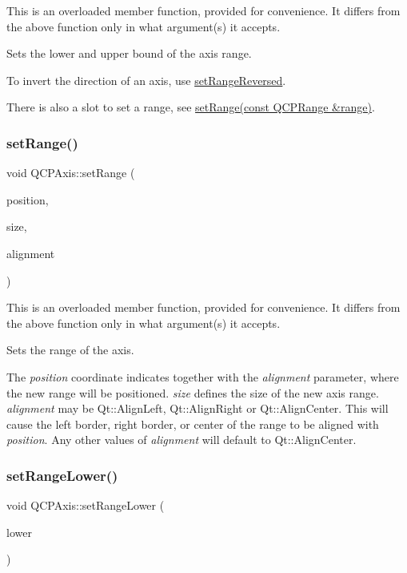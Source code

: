 This is an overloaded member function, provided for convenience. It differs from the above function only in what argument(s) it accepts.

Sets the lower and upper bound of the axis range.

To invert the direction of an axis, use \hyperlink{classQCPAxis_a2172fdb196b1a0dc3f40992fcad8e9e1}{set\+Range\+Reversed}.

There is also a slot to set a range, see \hyperlink{classQCPAxis_aebdfea5d44c3a0ad2b4700cd4d25b641}{set\+Range(const Q\+C\+P\+Range \&range)}. \mbox{\label{classQCPAxis_acf60e5b2d631fbc8c4548c3d579cb6d0}} 
\subsubsection{\texorpdfstring{set\+Range()}{setRange()}\hspace{0.1cm}{\footnotesize\ttfamily [3/3]}}
{\footnotesize\ttfamily void Q\+C\+P\+Axis\+::set\+Range (\begin{DoxyParamCaption}\item[{double}]{position,  }\item[{double}]{size,  }\item[{Qt\+::\+Alignment\+Flag}]{alignment }\end{DoxyParamCaption})}

This is an overloaded member function, provided for convenience. It differs from the above function only in what argument(s) it accepts.

Sets the range of the axis.

The {\itshape position} coordinate indicates together with the {\itshape alignment} parameter, where the new range will be positioned. {\itshape size} defines the size of the new axis range. {\itshape alignment} may be Qt\+::\+Align\+Left, Qt\+::\+Align\+Right or Qt\+::\+Align\+Center. This will cause the left border, right border, or center of the range to be aligned with {\itshape position}. Any other values of {\itshape alignment} will default to Qt\+::\+Align\+Center. \mbox{\label{classQCPAxis_afcf51227d337db28d1a9ce9a4d1bc91a}} 
\subsubsection{\texorpdfstring{set\+Range\+Lower()}{setRangeLower()}}
{\footnotesize\ttfamily void Q\+C\+P\+Axis\+::set\+Range\+Lower (\begin{DoxyParamCaption}\item[{double}]{lower }\end{DoxyParamCaption})}

